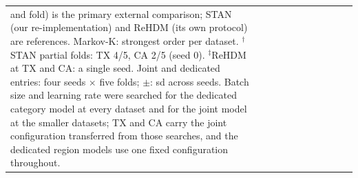 \begin{table}[!t]
\begin{tabular}{l r | r r r r | r r r r r}
{and fold) is the primary external comparison; STAN (our re-implementation) and ReHDM (its own protocol)
are references. Markov-K: strongest order per dataset. $^{\dagger}$STAN partial folds: TX 4/5, CA 2/5
(seed 0). $^{\ddagger}$ReHDM at TX and CA: a single seed. Joint and dedicated entries: four seeds
$\times$ five folds; $\pm$: sd across seeds. Batch size and learning rate were searched for the
dedicated category model at every dataset and for the joint model at the smaller datasets; TX and CA
carry the joint configuration transferred from those searches, and the dedicated region models use
one fixed configuration throughout.} \\
\end{tabular}
\end{table}
